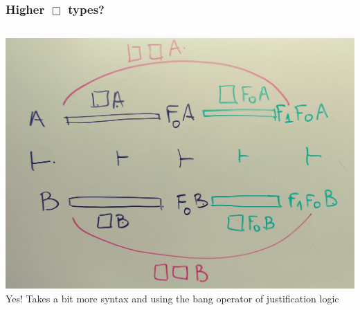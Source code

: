 \documentclass{beamer}
\begin{document}
    \begin{frame}
      \frametitle{Higher $\Box$ types?}
      \begin{columns}
      \includegraphics[scale=0.05]{pics/20171111_141413_Film1}
          Yes! Takes  a bit more syntax and using the bang operator of justification logic
    \end{columns}
      \end{frame}
  
\end{document}
